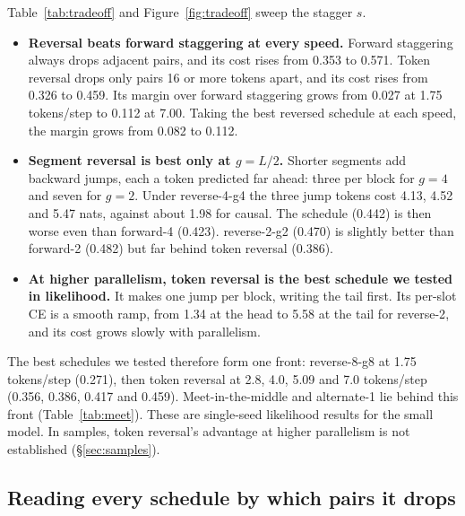 \documentclass[11pt]{article}
\theoremstyle{definition}
\theoremstyle{remark}
\newcommand{\sch}[1]{\textsf{#1}}
\begin{document}
Table~\ref{tab:tradeoff} and Figure~\ref{fig:tradeoff} sweep the stagger $s$.
\begin{itemize}
  \item \textbf{Reversal beats forward staggering at every speed.} Forward staggering always drops adjacent pairs, and its cost rises from 0.353 to 0.571. Token reversal drops only pairs 16 or more tokens apart, and its cost rises from 0.326 to 0.459. Its margin over forward staggering grows from 0.027 at 1.75 tokens/step to 0.112 at 7.00. Taking the best reversed schedule at each speed, the margin grows from 0.082 to 0.112.
  \item \textbf{Segment reversal is best only at $g=L/2$.} Shorter segments add backward jumps, each a token predicted far ahead: three per block for $g=4$ and seven for $g=2$. Under \sch{reverse-4-g4} the three jump tokens cost 4.13, 4.52 and 5.47 nats, against about 1.98 for causal. The schedule (0.442) is then worse even than \sch{forward-4} (0.423). \sch{reverse-2-g2} (0.470) is slightly better than \sch{forward-2} (0.482) but far behind token reversal (0.386).
  \item \textbf{At higher parallelism, token reversal is the best schedule we tested in likelihood.} It makes one jump per block, writing the tail first. Its per-slot CE is a smooth ramp, from 1.34 at the head to 5.58 at the tail for \sch{reverse-2}, and its cost grows slowly with parallelism.
\end{itemize}
The best schedules we tested therefore form one front: \sch{reverse-8-g8} at 1.75 tokens/step (0.271), then token reversal at 2.8, 4.0, 5.09 and 7.0 tokens/step (0.356, 0.386, 0.417 and 0.459).
Meet-in-the-middle and \sch{alternate-1} lie behind this front (Table~\ref{tab:meet}).
These are single-seed likelihood results for the small model.
In samples, token reversal's advantage at higher parallelism is not established (\S\ref{sec:samples}).

\subsection{Reading every schedule by which pairs it drops}
\label{sec:lens}
\end{document}
